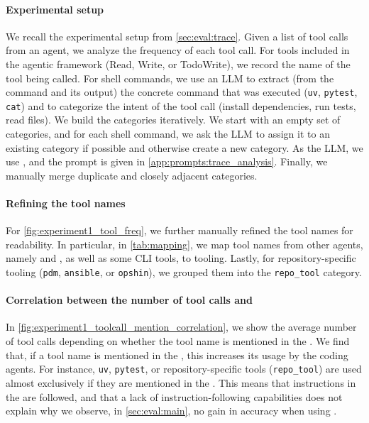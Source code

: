 \paragraph{Experimental setup}
We recall the experimental setup from \cref{sec:eval:trace}.
Given a list of tool calls from an agent, we analyze the frequency of each tool call.
For tools included in the agentic framework (\eg Read, Write, or TodoWrite), we record the name of the tool being called.
For shell commands, we use an LLM to extract (from the command and its output) the concrete command that was executed (\eg \texttt{uv}, \texttt{pytest}, \texttt{cat}) and to categorize the intent of the tool call (\eg install dependencies, run tests, read files).
We build the categories iteratively.
We start with an empty set of categories, and for each shell command, we ask the LLM to assign it to an existing category if possible and otherwise create a new category.
As the LLM, we use \gptoss, and the prompt is given in \cref{app:prompts:trace_analysis}.
Finally, we manually merge duplicate and closely adjacent categories.



\paragraph{Refining the tool names}
For \cref{fig:experiment1_tool_freq}, we further manually refined the tool names for readability.
In particular, in \cref{tab:mapping}, we map tool names from other agents, namely \codex{} and \qwencode{}, as well as some CLI tools, to \claudecode{} tooling.
Lastly, for repository-specific tooling (\eg \texttt{pdm}, \texttt{ansible}, or \texttt{opshin}), we grouped them into the \texttt{repo\_tool} category. \\





\paragraph{Correlation between the number of tool calls and \agentsmds{}}
In \cref{fig:experiment1_toolcall_mention_correlation}, we show the average number of tool calls depending on whether the tool name is mentioned in the \agentsmd{}.
We find that, if a tool name is mentioned in the \agentsmds{}, this increases its usage by the coding agents.
For instance, \texttt{uv}, \texttt{pytest}, or repository-specific tools (\texttt{repo\_tool}) are used almost exclusively if they are mentioned in the \agentsmd{}.
This means that instructions in the \agentsmds{} are followed, and that a lack of instruction-following capabilities does not explain why we observe, in \cref{sec:eval:main}, no gain in accuracy when using \agentsmds{}.

